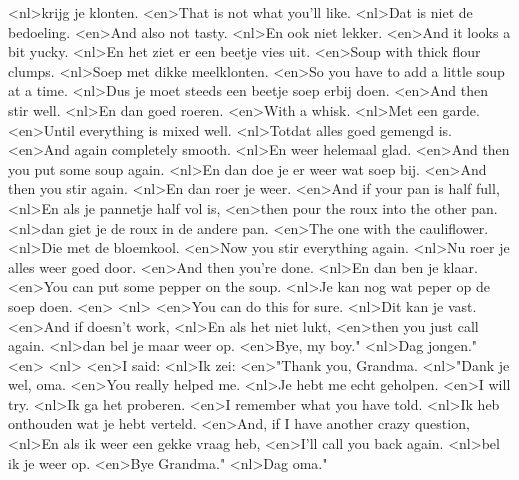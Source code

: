 <nl>krijg je klonten.
<en>That is not what you'll like.
<nl>Dat is niet de bedoeling.
<en>And also not tasty.
<nl>En ook niet lekker.
<en>And it looks a bit yucky.
<nl>En het ziet er een beetje vies uit.
<en>Soup with thick flour clumps.
<nl>Soep met dikke meelklonten.
<en>So you  have to add a little soup at a time.
<nl>Dus je moet steeds een beetje soep erbij doen.
<en>And then stir well.
<nl>En dan goed roeren.
<en>With a whisk.
<nl>Met een garde.
<en>Until everything is mixed well.
<nl>Totdat alles goed gemengd is.
<en>And again completely smooth.
<nl>En weer helemaal glad.
<en>And then you put some soup again.
<nl>En dan doe je er weer wat soep bij.
<en>And then you stir again.
<nl>En dan roer je weer.
<en>And if your pan is half full,
<nl>En als je pannetje half vol is,
<en>then pour the roux into the other pan.
<nl>dan giet je de roux in de andere pan.
<en>The one with the cauliflower.
<nl>Die met de bloemkool.
<en>Now you stir everything again.
<nl>Nu roer je alles weer goed door.
<en>And then you're done.
<nl>En dan ben je klaar.
<en>You can put some pepper on the soup.
<nl>Je kan nog wat peper op de soep doen.
<en>
<nl>
<en>You can do this for sure.
<nl>Dit kan je vast.
<en>And if doesn't work,
<nl>En als het niet lukt,
<en>then you just call again.
<nl>dan bel je maar weer op.
<en>Bye, my boy."
<nl>Dag jongen."
<en>
<nl>
<en>I said:
<nl>Ik zei:
<en>"Thank you, Grandma.
<nl>"Dank je wel, oma.
<en>You really helped me.
<nl>Je hebt me echt geholpen.
<en>I will try.
<nl>Ik ga het proberen.
<en>I remember what you have told.
<nl>Ik heb onthouden wat je hebt verteld.
<en>And, if I have another crazy question,
<nl>En als ik weer een gekke vraag heb,
<en>I'll call you back again.
<nl>bel ik je weer op.
<en>Bye Grandma."
<nl>Dag oma."
